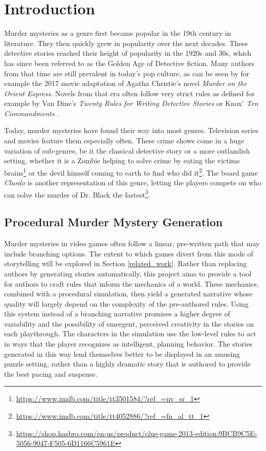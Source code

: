 \section{Introduction} \label{introduction}

Murder mysteries as a genre first became popular in the 19th century in literature.
They then quickly grew in popularity over the next decades.
These detective stories reached their height of popularity in the 1920s and 30s, which has since been referred to as the Golden Age of Detective fiction.
Many authors from that time are still prevalent in today's pop culture, as can be seen by for example the 2017 movie adaptation of Agatha Christie's novel \emph{Murder on the Orient Express}.
Novels from that era often follow very strict rules as defined for example by Van Dine's \emph{Twenty Rules for Writing Detective Stories} \cite{van_dine_1928} or Knox' \emph{Ten Commandments} \cite{knox_1929}.

Today, murder mysteries have found their way into most genres.
Television series and movies feature them especially often.
These crime shows come in a huge variation of sub-genres, be it the classical detective story or a more outlandish setting, whether it is a Zombie helping to solve crime by eating the victims brains\footnote{\url{https://www.imdb.com/title/tt3501584/?ref_=nv_sr_1}} or the devil himself coming to earth to find who did it\footnote{\url{https://www.imdb.com/title/tt4052886/?ref_=fn_al_tt_1}}.
The board game \emph{Cluedo} is another representation of this genre, letting the players compete on who can solve the murder of Dr. Black the fastest\footnote{\url{https://shop.hasbro.com/en-us/product/clue-game-2013-edition:9BCB9C5E-5056-9047-F505-6D1166C5961E}}.

\subsection{Procedural Murder Mystery Generation}
Murder mysteries in video games often follow a linear, pre-written path that may include branching options.
The extent to which games divert from this mode of storytelling will be explored in Section \ref{related_work}.
Rather than replacing authors by generating stories automatically, this project aims to provide a tool for authors to craft rules that inform the mechanics of a world.
These mechanics, combined with a procedural simulation, then yield a generated narrative whose quality will largely depend on the complexity of the pre-authored rules.
Using this system instead of a branching narrative promises a higher degree of variability and the possibility of emergent, perceived creativity in the stories on each playthrough.
The characters in the simulation use the low-level rules to act in ways that the player recognizes as intelligent, planning behavior.
The stories generated in this way lend themselves better to be displayed in an amusing puzzle setting, rather than a highly dramatic story that is authored to provide the best pacing and suspense.

